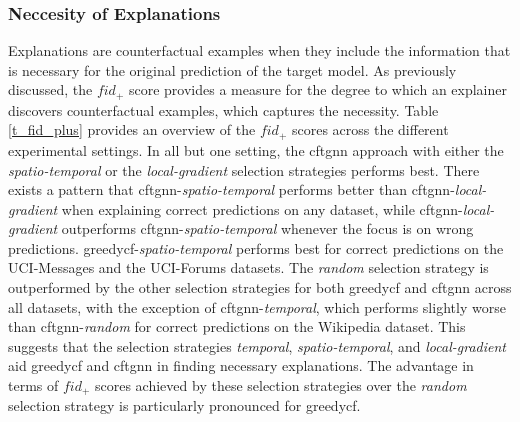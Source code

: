 
\FloatBarrier
\subsubsection{Neccesity of Explanations}
\label{s_Evaluation_Results_Neccesity}

Explanations are counterfactual examples when they include the information that is necessary for the original prediction of the target model. As previously discussed, the $fid_+$ score provides a measure for the degree to which an explainer discovers counterfactual examples, which captures the necessity. Table \ref{t_fid_plus} provides an overview of the $fid_+$ scores across the different experimental settings. In all but one setting, the \gls{cftgnn} approach with either the \textit{spatio-temporal} or the \textit{local-gradient} selection strategies performs best. There exists a pattern that \gls{cftgnn}-\textit{spatio-temporal} performs better than \gls{cftgnn}-\textit{local-gradient} when explaining correct predictions on any dataset, while \gls{cftgnn}-\textit{local-gradient} outperforms \gls{cftgnn}-\textit{spatio-temporal} whenever the focus is on wrong predictions. \gls{greedycf}-\textit{spatio-temporal} performs best for correct predictions on the UCI-Messages and the UCI-Forums datasets. The \textit{random} selection strategy is outperformed by the other selection strategies for both \gls{greedycf} and \gls{cftgnn} across all datasets, with the exception of \gls{cftgnn}-\textit{temporal}, which performs slightly worse than \gls{cftgnn}-\textit{random} for correct predictions on the Wikipedia dataset. This suggests that the selection strategies \textit{temporal}, \textit{spatio-temporal}, and \textit{local-gradient} aid \gls{greedycf} and \gls{cftgnn} in finding necessary explanations. The advantage in terms of $fid_+$ scores achieved by these selection strategies over the \textit{random} selection strategy is particularly pronounced for \gls{greedycf}.




